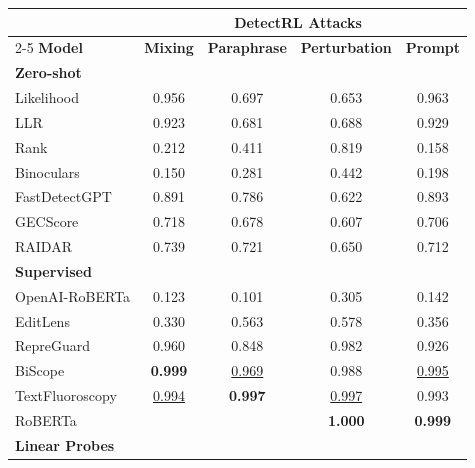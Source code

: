 \begin{tabular}{lcccc}
\toprule
& \multicolumn{4}{c}{\textbf{DetectRL Attacks~\citep{wu2024detectrl}}} \\
\cmidrule(lr){2-5}
\textbf{Model} & \textbf{Mixing} & \textbf{Paraphrase} & \textbf{Perturbation} & \textbf{Prompt} \\
\midrule
\multicolumn{5}{l}{\textbf{Zero-shot}} \\
\midrule
Likelihood & 0.956 & 0.697 & 0.653 & 0.963 \\
LLR & 0.923 & 0.681 & 0.688 & 0.929 \\
Rank & 0.212 & 0.411 & 0.819 & 0.158 \\
Binoculars & 0.150 & 0.281 & 0.442 & 0.198 \\
FastDetectGPT & 0.891 & 0.786 & 0.622 & 0.893 \\
GECScore & 0.718 & 0.678 & 0.607 & 0.706 \\
RAIDAR & 0.739 & 0.721 & 0.650 & 0.712 \\
\midrule
\multicolumn{5}{l}{\textbf{Supervised}} \\
\midrule
OpenAI-RoBERTa & 0.123 & 0.101 & 0.305 & 0.142 \\
EditLens & 0.330 & 0.563 & 0.578 & 0.356 \\
RepreGuard & 0.960 & 0.848 & 0.982 & 0.926 \\
BiScope & \cellcolor{cyan!25}\textbf{0.999} & \cellcolor{orange!25}\underline{0.969} & 0.988 & \cellcolor{orange!25}\underline{0.995} \\
TextFluoroscopy & \cellcolor{orange!25}\underline{0.994} & \cellcolor{cyan!25}\textbf{0.997} & \cellcolor{orange!25}\underline{0.997} & 0.993 \\
RoBERTa &  &  & \cellcolor{cyan!25}\textbf{1.000} & \cellcolor{cyan!25}\textbf{0.999} \\
\midrule
\multicolumn{5}{l}{\textbf{Linear Probes}} \\
\midrule
\bottomrule
\end{tabular}
